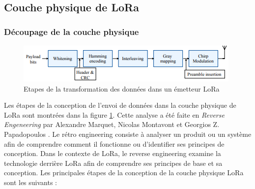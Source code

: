 \subsection{Couche physique de LoRa}

\subsubsection{Découpage de la couche physique}

\begin{figure}[h]
\centering

\includegraphics[scale=1]{images/physical_lora_rx.PNG}
\caption{Etapes de la transformation des données dans un émetteur LoRa \cite{loraphy}}\label{term4}
\end{figure}


Les étapes de la conception de l'envoi de données dans la couche physique de LoRa sont montrées dans la figure \ref{term4}. Cette analyse a été faite en \textit{Reverse Engeneering} par Alexandre Marquet, Nicolas Montavont et Georgios Z. Papadopoulos \cite{lorareverse}. Le rétro engineering consiste à analyser un produit ou un système afin de comprendre comment il fonctionne ou d'identifier ses principes de conception. Dans le contexte de LoRa, le reverse engineering examine la technologie derrière LoRa afin de comprendre ses principes de base et sa conception. Les principales étapes de la conception de la couche physique LoRa sont les suivants :

\vspace{0.1cm}

